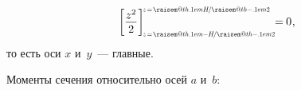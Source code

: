 \documentclass[14pt]{extarticle}
\makeatletter
\newcommand{\raisemath}[1]{\mathpalette{\raisem@th{#1}}}
\newcommand{\raisem@th}[3]{\raisebox{#1}{$#2#3$}}
\makeatother
\begin{document}
\[\left[ \displaystyle\frac{\raisebox{-.1em}{$ z^2 $}}{2} \hspace{.1ex} \right]_{\hspace{-.25ex}\scalebox{.6}{$ z \!=\! \raisemath{.1em}{-H} \hspace{-.3ex} / \hspace{-.1ex} \raisemath{-.1em}{2} $}}^{\hspace{-.25ex} \scalebox{.6}{$ z \!=\! \raisemath{.1em}{H} \hspace{-.3ex} / \hspace{-.1ex} \raisemath{-.1em}{2} $}} \hspace{-.8ex}
=\hspace{-0.1ex} 0
\hspace{.1ex} ,
\]
то есть оси $x$ и~$y$~--- главные.

Моменты сечения относительно осей $a$ и~$b$:
\end{document}

